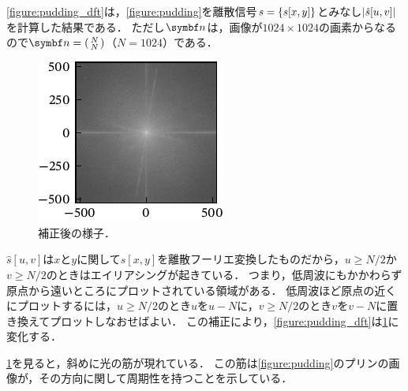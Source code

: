 \documentclass[../../main]{subfiles}
\begin{document}
\cref{figure:pudding_dft}は，\cref{figure:pudding}を離散信号\(s=\lbrace s[x,y]\rbrace\)とみなし\(\lvert\hat{s}[u,v]\rvert\)を計算した結果である．
ただし\(\vect{n}\)は，画像が\(1024\times 1024\)の画素からなるので\(\vect{n}=\smallmatrice{N \\ N}\)（\(N=1024\)）である．

\begin{figure}
  \centering
  \includegraphics{figures/pudding_shift.pdf}
  \caption{補正後の様子．}
  \label{figure:pudding_shift}
\end{figure}

\(\hat{s}[u,v]\)は\(x\)と\(y\)に関して\(s[x,y]\)を離散フーリエ変換したものだから，\(u\geq N/2\)か\(v\geq N/2\)のときはエイリアシングが起きている．
つまり，低周波にもかかわらず原点から遠いところにプロットされている領域がある．
低周波ほど原点の近くにプロットするには，\(u\geq N/2\)のとき\(u\)を\(u-N\)に，\(v\geq N/2\)のとき\(v\)を\(v-N\)に置き換えてプロットしなおせばよい．
この補正により，\cref{figure:pudding_dft}は\cref{figure:pudding_shift}に変化する．

\cref{figure:pudding_shift}を見ると，斜めに光の筋が現れている．
この筋は\cref{figure:pudding}のプリンの画像が，その方向に関して周期性を持つことを示している．
\end{document}
